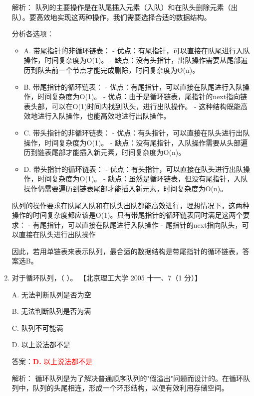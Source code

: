 \documentclass[lang=cn,newtx,10pt,scheme=chinese]{../../../elegantbook}
\begin{document}
\begin{enumerate}
    解析：
    队列的主要操作是在队尾插入元素（入队）和在队头删除元素（出队）。要高效地实现这两种操作，我们需要选择合适的数据结构。

    分析各选项：
    \begin{itemize}
        \item A. 带尾指针的非循环链表：
           - 优点：有尾指针，可以直接在队尾进行入队操作，时间复杂度为O(1)。
           - 缺点：没有头指针，出队操作需要从尾部遍历到队头前一个节点才能完成删除，时间复杂度为O(n)。
        
        \item B. 带尾指针的循环链表：
           - 优点：有尾指针，可以直接在队尾进行入队操作，时间复杂度为O(1)。
           - 优点：由于是循环链表，尾指针的next指向链表头部，可以在O(1)时间内找到队头，进行出队操作。
           - 这种结构既能高效地进行入队操作，也能高效地进行出队操作。
        
        \item C. 带头指针的非循环链表：
           - 优点：有头指针，可以直接在队头进行出队操作，时间复杂度为O(1)。
           - 缺点：没有尾指针，入队操作需要从头部遍历到链表尾部才能插入新元素，时间复杂度为O(n)。
        
        \item D. 带头指针的循环链表：
           - 优点：有头指针，可以直接在队头进行出队操作，时间复杂度为O(1)。
           - 缺点：虽然是循环链表，但没有尾指针，入队操作仍需要遍历到链表尾部才能插入新元素，时间复杂度为O(n)。
    \end{itemize}

    队列的操作要求在队尾入队和在队头出队都能高效进行，理想情况下，这两种操作的时间复杂度都应该是O(1)。只有带尾指针的循环链表同时满足这两个要求：
    - 有尾指针，可以直接在队尾进行入队操作
    - 尾指针的next指向队头，可以直接在队头进行出队操作
    
    因此，若用单链表来表示队列，最合适的数据结构是带尾指针的循环链表，答案选B。

    \item 对于循环队列，（ ）。  
    【北京理工大学 2005 十一、7（1 分）】  

    A. 无法判断队列是否为空  

    B. 无法判断队列是否为满  

    C. 队列不可能满  

    D. 以上说法都不是  

    答案：\textcolor{red}{\textbf{D.} 以上说法都不是}

    解析：
    循环队列是为了解决普通顺序队列的"假溢出"问题而设计的。在循环队列中，队列的头尾相连，形成一个环形结构，以便有效利用存储空间。


\end{enumerate}
\end{document}
